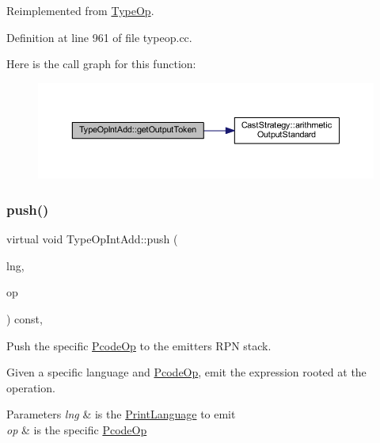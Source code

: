 Reimplemented from \mbox{\hyperlink{class_type_op_a7150ac93bb03a993735c829deb5237e7}{Type\+Op}}.



Definition at line 961 of file typeop.\+cc.

Here is the call graph for this function\+:
\nopagebreak
\begin{figure}[H]
\begin{center}
\leavevmode
\includegraphics[width=350pt]{class_type_op_int_add_aae4df67ef6e65039c3a05cea8bdef6c4_cgraph}
\end{center}
\end{figure}
\mbox{\label{class_type_op_int_add_aef08e55caf43842a91d116ba2174091e}} 
\subsubsection{\texorpdfstring{push()}{push()}}
{\footnotesize\ttfamily virtual void Type\+Op\+Int\+Add\+::push (\begin{DoxyParamCaption}\item[{\mbox{\hyperlink{class_print_language}{Print\+Language}} $\ast$}]{lng,  }\item[{const \mbox{\hyperlink{class_pcode_op}{Pcode\+Op}} $\ast$}]{op }\end{DoxyParamCaption}) const\hspace{0.3cm}{\ttfamily [inline]}, {\ttfamily [virtual]}}



Push the specific \mbox{\hyperlink{class_pcode_op}{Pcode\+Op}} to the emitter\textquotesingle{}s R\+PN stack. 

Given a specific language and \mbox{\hyperlink{class_pcode_op}{Pcode\+Op}}, emit the expression rooted at the operation. 
\begin{DoxyParams}{Parameters}
{\em lng} & is the \mbox{\hyperlink{class_print_language}{Print\+Language}} to emit \\
\hline
{\em op} & is the specific \mbox{\hyperlink{class_pcode_op}{Pcode\+Op}} \\
\hline
\end{DoxyParams}


